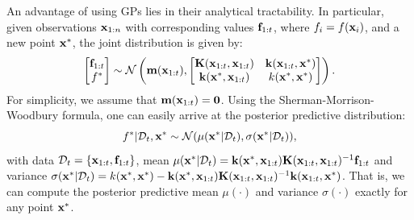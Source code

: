 \documentclass{article}
\begin{document}
An advantage of using GPs lies in their analytical tractability. In particular, given observations $\mathbf{x}_{1:n}$ with corresponding values $\mathbf{f}_{1:t}$, where $f_i = f(\mathbf{x}_i)$,  and a new point $\mathbf{x}^{*}$, the joint distribution is given by:
$$
\begin{bmatrix}\mathbf{f}_{1:t} \\
f^* \end{bmatrix} \sim \mathcal{N}\left( \mathbf{m}(\mathbf{x}_{1:t}),  \begin{bmatrix}
\mathbf{K}(\mathbf{x}_{1:t}, \mathbf{x}_{1:t}) & \mathbf{k}(\mathbf{x}_{1:t}, \mathbf{x}^*)\\
\mathbf{k}(\mathbf{x}^*, \mathbf{x}_{1:t}) & k(\mathbf{x}^*, \mathbf{x}^*)\end{bmatrix}\right).
$$
For simplicity, we assume that $\mathbf{m}(\mathbf{x}_{1:t}) = \mathbf{0}$. Using the Sherman-Morrison-Woodbury formula, one can easily arrive at the posterior predictive distribution:
$$
f^* | {\cal D}_t, \mathbf{x}^* \sim \mathcal{N}(\mu(\mathbf{x}^*|{\cal D}_t), \sigma(\mathbf{x}^*|{\cal D}_t)),
$$
with data ${\cal D}_t = \{\mathbf{x}_{1:t}, \mathbf{f}_{1:t} \}$, mean
$\mu(\mathbf{x}^*|{\cal D}_t) = \mathbf{k}(\mathbf{x}^*, \mathbf{x}_{1:t}) \mathbf{K}(\mathbf{x}_{1:t}, \mathbf{x}_{1:t})^{-1} \mathbf{f}_{1:t}$ and variance $\sigma(\mathbf{x}^*|{\cal D}_t) = k(\mathbf{x}^*, \mathbf{x}^*)-\mathbf{k}(\mathbf{x}^*, \mathbf{x}_{1:t}) \mathbf{K}(\mathbf{x}_{1:t},\mathbf{x}_{1:t})^{-1} \mathbf{k}(\mathbf{x}_{1:t}, \mathbf{x}^*)$.
That is, we can compute the posterior predictive mean $\mu(\cdot)$ and variance $\sigma(\cdot)$ exactly for any point $\mathbf{x}^*$.
\end{document}
